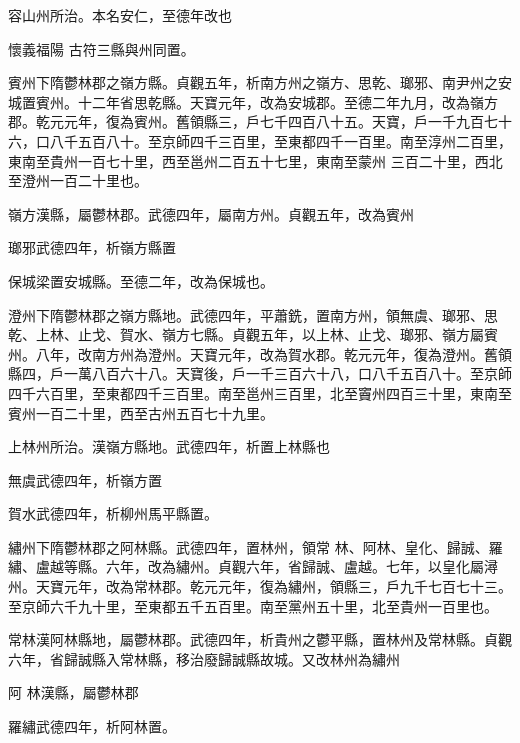 \begin{pinyinscope}
 容山州所治。本名安仁，至德年改也



 懷義福陽
 古符三縣與州同置。



 賓州下隋鬱林郡之嶺方縣。貞觀五年，析南方州之嶺方、思乾、瑯邪、南尹州之安城置賓州。十二年省思乾縣。天寶元年，改為安城郡。至德二年九月，改為嶺方郡。乾元元年，復為賓州。舊領縣三，戶七千四百八十五。天寶，戶一千九百七十六，口八千五百八十。至京師四千三百里，至東都四千一百里。南至淳州二百里，東南至貴州一百七十里，西至邕州二百五十七里，東南至蒙州
 三百二十里，西北至澄州一百二十里也。



 嶺方漢縣，屬鬱林郡。武德四年，屬南方州。貞觀五年，改為賓州



 瑯邪武德四年，析嶺方縣置



 保城梁置安城縣。至德二年，改為保城也。



 澄州下隋鬱林郡之嶺方縣地。武德四年，平蕭銑，置南方州，領無虞、瑯邪、思乾、上林、止戈、賀水、嶺方七縣。貞觀五年，以上林、止戈、瑯邪、嶺方屬賓州。八年，改南方州為澄州。天寶元年，改為賀水郡。乾元元年，復為澄州。舊領
 縣四，戶一萬八百六十八。天寶後，戶一千三百六十八，口八千五百八十。至京師四千六百里，至東都四千三百里。南至邕州三百里，北至竇州四百三十里，東南至賓州一百二十里，西至古州五百七十九里。



 上林州所治。漢嶺方縣地。武德四年，析置上林縣也



 無虞武德四年，析嶺方置



 賀水武德四年，析柳州馬平縣置。



 繡州下隋鬱林郡之阿林縣。武德四年，置林州，領常
 林、阿林、皇化、歸誠、羅繡、盧越等縣。六年，改為繡州。貞觀六年，省歸誠、盧越。七年，以皇化屬潯州。天寶元年，改為常林郡。乾元元年，復為繡州，領縣三，戶九千七百七十三。至京師六千九十里，至東都五千五百里。南至黨州五十里，北至貴州一百里也。



 常林漢阿林縣地，屬鬱林郡。武德四年，析貴州之鬱平縣，置林州及常林縣。貞觀六年，省歸誠縣入常林縣，移治廢歸誠縣故城。又改林州為繡州



 阿
 林漢縣，屬鬱林郡



 羅繡武德四年，析阿林置。




\end{pinyinscope}
